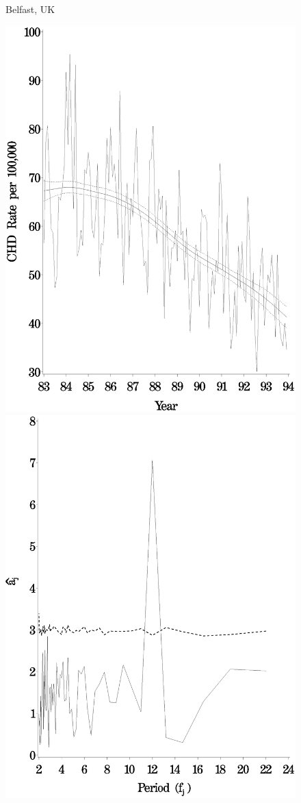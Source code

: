 \begin{figure}[!h]
\centerline{Belfast, UK}
    \centerline{
    \includegraphics[scale=0.2]{figures/trend_twostage_belfast.eps}
    \includegraphics[scale=0.2]{figures/periodogram_twostage_belfast.eps}
}
\end{figure}
